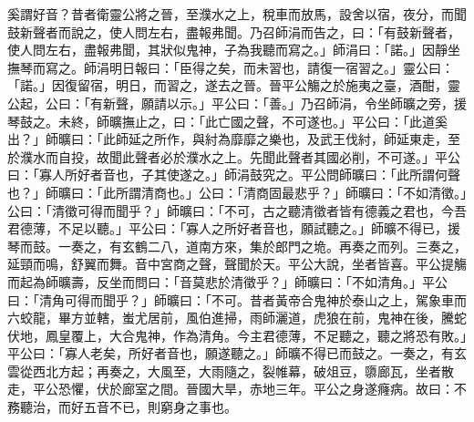 \begin{pinyinscope}
奚謂好音？昔者衛靈公將之晉，至濮水之上，稅車而放馬，設舍以宿，夜分，而聞鼓新聲者而說之，使人問左右，盡報弗聞。乃召師涓而告之，曰：「有鼓新聲者，使人問左右，盡報弗聞，其狀似鬼神，子為我聽而寫之。」師涓曰：「諾。」因靜坐撫琴而寫之。師涓明日報曰：「臣得之矣，而未習也，請復一宿習之。」靈公曰：「諾。」因復留宿，明日，而習之，遂去之晉。晉平公觴之於施夷之臺，酒酣，靈公起，公曰：「有新聲，願請以示。」平公曰：「善。」乃召師涓，令坐師曠之旁，援琴鼓之。未終，師曠撫止之，曰：「此亡國之聲，不可遂也。」平公曰：「此道奚出？」師曠曰：「此師延之所作，與紂為靡靡之樂也，及武王伐紂，師延東走，至於濮水而自投，故聞此聲者必於濮水之上。先聞此聲者其國必削，不可遂。」平公曰：「寡人所好者音也，子其使遂之。」師涓鼓究之。平公問師曠曰：「此所謂何聲也？」師曠曰：「此所謂清商也。」公曰：「清商固最悲乎？」師曠曰：「不如清徵。」公曰：「清徵可得而聞乎？」師曠曰：「不可，古之聽清徵者皆有德義之君也，今吾君德薄，不足以聽。」平公曰：「寡人之所好者音也，願試聽之。」師曠不得已，援琴而鼓。一奏之，有玄鶴二八，道南方來，集於郎門之垝。再奏之而列。三奏之，延頸而鳴，舒翼而舞。音中宮商之聲，聲聞於天。平公大說，坐者皆喜。平公提觴而起為師曠壽，反坐而問曰：「音莫悲於清徵乎？」師曠曰：「不如清角。」平公曰：「清角可得而聞乎？」師曠曰：「不可。昔者黃帝合鬼神於泰山之上，駕象車而六蛟龍，畢方並轄，蚩尤居前，風伯進掃，雨師灑道，虎狼在前，鬼神在後，騰蛇伏地，鳳皇覆上，大合鬼神，作為清角。今主君德薄，不足聽之，聽之將恐有敗。」平公曰：「寡人老矣，所好者音也，願遂聽之。」師曠不得已而鼓之。一奏之，有玄雲從西北方起；再奏之，大風至，大雨隨之，裂帷幕，破俎豆，隳廊瓦，坐者散走，平公恐懼，伏於廊室之間。晉國大旱，赤地三年。平公之身遂癃病。故曰：不務聽治，而好五音不已，則窮身之事也。


\end{pinyinscope}
